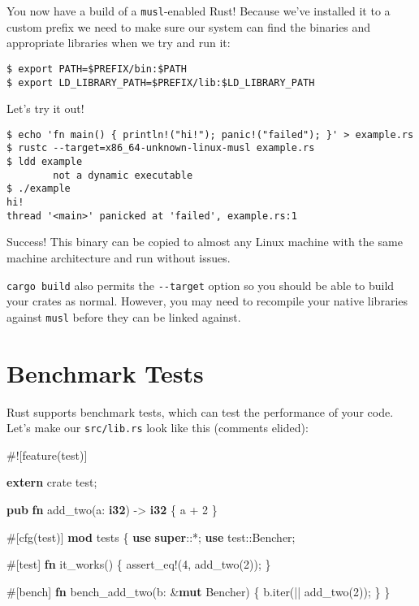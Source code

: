 \documentclass[a4paper,]{book}
\newenvironment{Shaded}{\begin{snugshade}}{\end{snugshade}}
\newcommand{\KeywordTok}[1]{\textcolor[rgb]{0.13,0.29,0.53}{\textbf{{#1}}}}
\newcommand{\DecValTok}[1]{\textcolor[rgb]{0.00,0.00,0.81}{{#1}}}
\newcommand{\OtherTok}[1]{\textcolor[rgb]{0.56,0.35,0.01}{{#1}}}
\newcommand{\NormalTok}[1]{{#1}}
\begin{document}
You now have a build of a \texttt{musl}-enabled Rust! Because we've
installed it to a custom prefix we need to make sure our system can find
the binaries and appropriate libraries when we try and run it:

\begin{verbatim}
$ export PATH=$PREFIX/bin:$PATH
$ export LD_LIBRARY_PATH=$PREFIX/lib:$LD_LIBRARY_PATH
\end{verbatim}

Let's try it out!

\begin{verbatim}
$ echo 'fn main() { println!("hi!"); panic!("failed"); }' > example.rs
$ rustc --target=x86_64-unknown-linux-musl example.rs
$ ldd example
        not a dynamic executable
$ ./example
hi!
thread '<main>' panicked at 'failed', example.rs:1
\end{verbatim}

Success! This binary can be copied to almost any Linux machine with the
same machine architecture and run without issues.

\texttt{cargo\ build} also permits the \texttt{-\/-target} option so you
should be able to build your crates as normal. However, you may need to
recompile your native libraries against \texttt{musl} before they can be
linked against.

\section{Benchmark Tests}\label{sec--benchmark-tests}

Rust supports benchmark tests, which can test the performance of your
code. Let's make our \texttt{src/lib.rs} look like this (comments
elided):

\begin{Shaded}
\begin{Highlighting}[]
\NormalTok{#![feature(test)]}

\KeywordTok{extern} \NormalTok{crate test;}

\KeywordTok{pub} \KeywordTok{fn} \NormalTok{add_two(a: }\KeywordTok{i32}\NormalTok{) -> }\KeywordTok{i32} \NormalTok{\{}
    \NormalTok{a + }\DecValTok{2}
\NormalTok{\}}

\OtherTok{#[}\NormalTok{cfg}\OtherTok{(}\NormalTok{test}\OtherTok{)]}
\KeywordTok{mod} \NormalTok{tests \{}
    \KeywordTok{use} \KeywordTok{super}\NormalTok{::*;}
    \KeywordTok{use} \NormalTok{test::Bencher;}

    \OtherTok{#[}\NormalTok{test}\OtherTok{]}
    \KeywordTok{fn} \NormalTok{it_works() \{}
        \OtherTok{assert_eq!}\NormalTok{(}\DecValTok{4}\NormalTok{, add_two(}\DecValTok{2}\NormalTok{));}
    \NormalTok{\}}

    \OtherTok{#[}\NormalTok{bench}\OtherTok{]}
    \KeywordTok{fn} \NormalTok{bench_add_two(b: &}\KeywordTok{mut} \NormalTok{Bencher) \{}
        \NormalTok{b.iter(|| add_two(}\DecValTok{2}\NormalTok{));}
    \NormalTok{\}}
\NormalTok{\}}
\end{Highlighting}
\end{Shaded}
\end{document}
